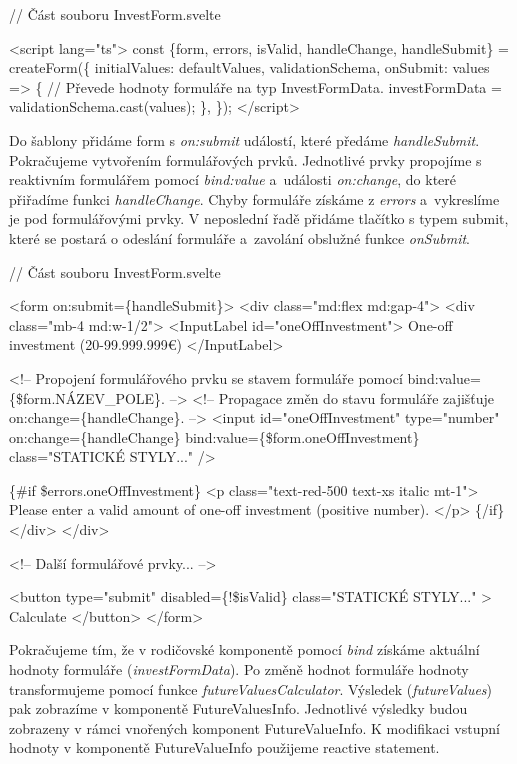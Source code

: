 \begin{prog}
// Část souboru InvestForm.svelte

<script lang="ts">
  const \{form, errors, isValid, handleChange, handleSubmit\} = createForm(\{
    initialValues: defaultValues,
    validationSchema,
    onSubmit: values => \{
      // Převede hodnoty formuláře na typ InvestFormData.
      investFormData = validationSchema.cast(values);
    \},
  \});
</script>
\end{prog}

Do šablony přidáme form s \emph{on:submit} událostí, které předáme \emph{handleSubmit}. Pokračujeme vytvořením formulářových prvků. 
Jednotlivé prvky propojíme s reaktivním formulářem pomocí \emph{bind:value} a~události \emph{on:change}, do které přiřadíme funkci \emph{handleChange}. 
Chyby formuláře získáme z \emph{errors} a~vykreslíme je pod formulářovými prvky. 
V neposlední řadě přidáme tlačítko s typem submit, které se postará o odeslání formuláře a~zavolání obslužné funkce \emph{onSubmit}.

\begin{prog}
// Část souboru InvestForm.svelte

<form on:submit=\{handleSubmit\}>
  <div class="md:flex md:gap-4">
    <div class="mb-4 md:w-1/2">
      <InputLabel id="oneOffInvestment">
        One-off investment (20-99.999.999€)
      </InputLabel>

      <!-- Propojení formulářového prvku se stavem formuláře
        pomocí bind:value=\{\$form.NÁZEV_POLE\}. -->
      <!-- Propagace změn do stavu formuláře 
        zajišťuje on:change=\{handleChange\}. -->
      <input
        id="oneOffInvestment"
        type="number"
        on:change=\{handleChange\}
        bind:value=\{\$form.oneOffInvestment\}
        class="STATICKÉ STYLY..."
      />

      \{#if \$errors.oneOffInvestment\}
        <p class="text-red-500 text-xs italic mt-1">
          Please enter a valid amount of one-off investment (positive number).
        </p>
      \{/if\}
    </div>
  </div>

  <!-- Další formulářové prvky... -->

  <button
    type="submit"
    disabled=\{!\$isValid\}
    class="STATICKÉ STYLY..."
  >
    Calculate
  </button>
</form>
\end{prog}

Pokračujeme tím, že v rodičovské komponentě pomocí \emph{bind} získáme aktuální hodnoty formuláře (\emph{investFormData}). Po změně hodnot formuláře hodnoty transformujeme pomocí funkce \emph{futureValuesCalculator}. 
Výsledek (\emph{futureValues}) pak zobrazíme v komponentě FutureValuesInfo. Jednotlivé výsledky budou zobrazeny v rámci vnořených komponent FutureValueInfo. 
K modifikaci vstupní hodnoty v komponentě FutureValueInfo použijeme reactive statement.

